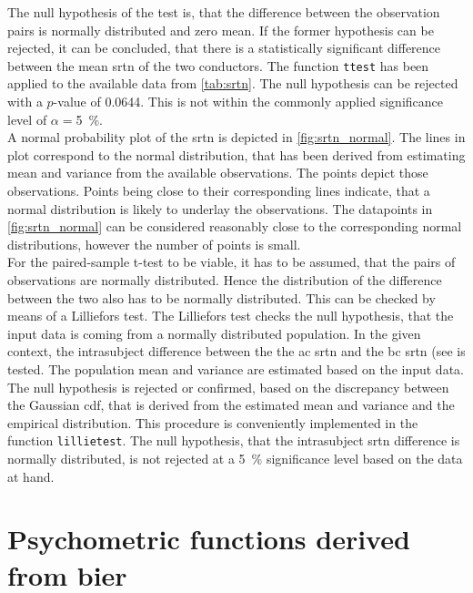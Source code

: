 The null hypothesis of the test is, that the difference between the observation pairs is normally distributed and zero mean. If the former hypothesis can be rejected, it can be concluded, that there is a statistically significant difference between the mean \gls{srtn} of the two conductors.
The \matlab function \texttt{ttest} has been applied to the available data from \autoref{tab:srtn}. The null hypothesis can be rejected with a $p$-value of 0.0644. This is not within the commonly applied significance level of $\alpha=$\SI{5}{\percent}.\\
A normal probability plot of the \gls{srtn} is depicted in \autoref{fig:srtn_normal}. The lines in plot correspond to the normal distribution, that has been derived from estimating mean and variance from the available observations. 
The points depict those observations. Points being close to their corresponding lines indicate, that a normal distribution is likely to underlay the observations. The datapoints in \autoref{fig:srtn_normal} can be considered reasonably close to the corresponding normal distributions, however the number of points is small.\\
For the paired-sample t-test to be viable, it has to be assumed, that the pairs of observations are normally distributed. Hence the distribution of the difference between the two also has to be normally distributed. 
This can be checked by means of a Lilliefors test.
The Lilliefors test checks the null hypothesis, that the input data is coming from a normally distributed population. 
In the given context, the intrasubject difference between the the \gls{ac} \gls{srtn} and the \gls{bc} \gls{srtn} (see  is tested.
The population mean and variance are estimated based on the input data. The null hypothesis is rejected or confirmed, based on the discrepancy between the Gaussian \gls{cdf}, that is derived from the estimated mean and variance and the empirical distribution.
This procedure is conveniently implemented in the \matlab function \texttt{lillietest}.
The null hypothesis, that the intrasubject \gls{srtn} difference is normally distributed, is not rejected at a \SI{5}{\percent} significance level based on the data at hand.\\



\section{Psychometric functions derived from \gls{bier}}\label{sec:result_psycho}

